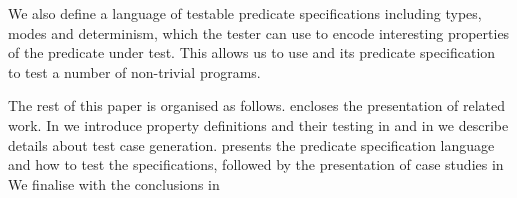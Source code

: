 




We also define a language of testable predicate specifications including
types, modes and determinism, which the tester can use to encode
interesting properties of the predicate under test.
%
This allows us to  use \plqc{} and its predicate specification to test a
number of non-trivial programs.




The rest of this paper is organised as follows.
%
 encloses the presentation of related work.
%
In  we introduce property definitions and their
testing in \plqc{} and in  we describe details
about test case generation.
%
 presents the predicate specification language
and how to test the specifications, followed by the presentation of case
studies in 
%
We finalise with the conclusions in 


